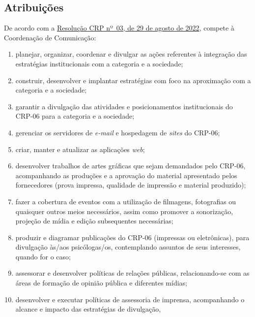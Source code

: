 \subsection{Atribuições}

De acordo com a
\href{https://transparencia.cfp.org.br/crp06/wp-content/uploads/sites/29/2022/09/Resolucao-03-22-PECS-f-1-assinada.pdf}{Resolução
  CRP nº~03, de 29 de agosto de 2022}, compete à Coordenação de
Comunicação:

\begin{enumerate}

  \item
        planejar, organizar, coordenar e divulgar as ações referentes à
        integração das estratégias institucionais com a categoria e a
        sociedade;
  \item
        construir, desenvolver e implantar estratégias com foco na aproximação
        com a categoria e a sociedade;
  \item
        garantir a divulgação das atividades e posicionamentos institucionais
        do CRP-06 para a categoria e a sociedade;
  \item
        gerenciar os servidores de \emph{e-mail} e hospedagem de \emph{sites}
        do CRP-06;
  \item
        criar, manter e atualizar as aplicações \emph{web};
  \item
        desenvolver trabalhos de artes gráficas que sejam demandados pelo
        CRP-06, acompanhando as produções e a aprovação do material
        apresentado pelos fornecedores (prova impressa, qualidade de impressão
        e material produzido);
  \item
        fazer a cobertura de eventos com a utilização de filmagens,
        fotografias ou quaisquer outros meios necessários, assim como promover
        a sonorização, projeção de mídia e edição subsequentes necessárias;
  \item
        produzir e diagramar publicações do CRP-06 (impressas ou eletrônicas),
        para divulgação às/aos psicólogas/os, contemplando assuntos de seus
        interesses, quando for o caso;
  \item
        assessorar e desenvolver políticas de relações públicas,
        relacionando-se com as áreas de formação de opinião pública e
        diferentes mídias;
  \item
        desenvolver e executar políticas de assessoria de imprensa,
        acompanhando o alcance e impacto das estratégias de divulgação,

\end{enumerate}
